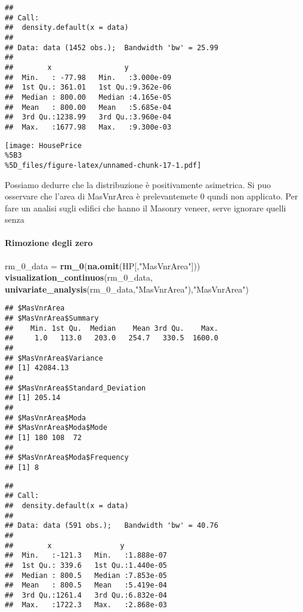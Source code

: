 \documentclass[
]{article}
\newenvironment{Shaded}{\begin{snugshade}}{\end{snugshade}}
\newcommand{\FunctionTok}[1]{\textcolor[rgb]{0.13,0.29,0.53}{\textbf{#1}}}
\newcommand{\NormalTok}[1]{#1}
\newcommand{\OtherTok}[1]{\textcolor[rgb]{0.56,0.35,0.01}{#1}}
\newcommand{\StringTok}[1]{\textcolor[rgb]{0.31,0.60,0.02}{#1}}
\begin{document}
\begin{verbatim}
## 
## Call:
##  density.default(x = data)
## 
## Data: data (1452 obs.);  Bandwidth 'bw' = 25.99
## 
##        x                 y            
##  Min.   : -77.98   Min.   :3.000e-09  
##  1st Qu.: 361.01   1st Qu.:9.362e-06  
##  Median : 800.00   Median :4.165e-05  
##  Mean   : 800.00   Mean   :5.685e-04  
##  3rd Qu.:1238.99   3rd Qu.:3.960e-04  
##  Max.   :1677.98   Max.   :9.300e-03
\end{verbatim}

\texttt{[image: HousePrice\\\%5B3\\\%5D\_files/figure-latex/unnamed-chunk-17-1.pdf]}

Possiamo dedurre che la distribuzione è positivamente asimetrica. Si puo
osservare che l'area di MasVnrArea è prelevantemete 0 qundi non
applicato. Per fare un analisi sugli edifici che hanno il Masonry
veneer, serve ignorare quelli senza

\paragraph{Rimozione degli zero}\label{rimozione-degli-zero-1}

\begin{Shaded}
\begin{Highlighting}[]
\NormalTok{rm\_0\_data }\OtherTok{=} \FunctionTok{rm\_0}\NormalTok{(}\FunctionTok{na.omit}\NormalTok{(HP[,}\StringTok{"MasVnrArea"}\NormalTok{]))}
\FunctionTok{visualization\_continuos}\NormalTok{(rm\_0\_data, }\FunctionTok{univariate\_analysis}\NormalTok{(rm\_0\_data,}\StringTok{"MasVnrArea"}\NormalTok{),}\StringTok{"MasVnrArea"}\NormalTok{)}
\end{Highlighting}
\end{Shaded}

\begin{verbatim}
## $MasVnrArea
## $MasVnrArea$Summary
##    Min. 1st Qu.  Median    Mean 3rd Qu.    Max. 
##     1.0   113.0   203.0   254.7   330.5  1600.0 
## 
## $MasVnrArea$Variance
## [1] 42084.13
## 
## $MasVnrArea$Standard_Deviation
## [1] 205.14
## 
## $MasVnrArea$Moda
## $MasVnrArea$Moda$Mode
## [1] 180 108  72
## 
## $MasVnrArea$Moda$Frequency
## [1] 8
\end{verbatim}

\begin{verbatim}
## 
## Call:
##  density.default(x = data)
## 
## Data: data (591 obs.);   Bandwidth 'bw' = 40.76
## 
##        x                y            
##  Min.   :-121.3   Min.   :1.888e-07  
##  1st Qu.: 339.6   1st Qu.:1.440e-05  
##  Median : 800.5   Median :7.853e-05  
##  Mean   : 800.5   Mean   :5.419e-04  
##  3rd Qu.:1261.4   3rd Qu.:6.832e-04  
##  Max.   :1722.3   Max.   :2.868e-03
\end{verbatim}
\end{document}
